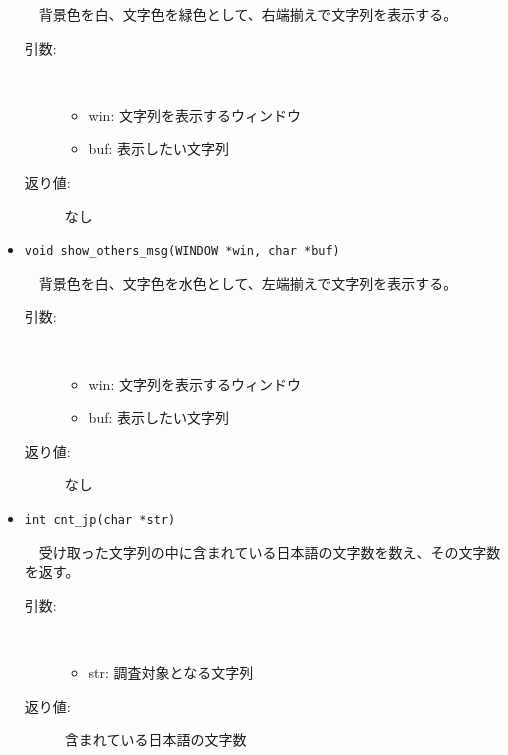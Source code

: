 \documentclass[uplatex,dvipdfmx,11pt,a4paper]{jsarticle} %
\begin{document}
\begin{itemize}
        　背景色を白、文字色を緑色として、右端揃えで文字列を表示する。
        \begin{description}
            \item[引数:] \ 

                \begin{itemize}
                    \item win: 文字列を表示するウィンドウ
                    \item buf: 表示したい文字列
                \end{itemize}
            \item[返り値:] なし
            \newline
        \end{description}

    \item {\tt void show\_others\_msg(WINDOW *win, char *buf)}

        　背景色を白、文字色を水色として、左端揃えで文字列を表示する。
        \begin{description}
            \item[引数:] \ 

                \begin{itemize}
                    \item win: 文字列を表示するウィンドウ
                    \item buf: 表示したい文字列
                \end{itemize}
            \item[返り値:] なし
            \newline
        \end{description}

    \item {\tt int cnt\_jp(char *str)}

        　受け取った文字列の中に含まれている日本語の文字数を数え、その文字数を返す。
        \begin{description}
            \item[引数:] \ 

                \begin{itemize}
                    \item str: 調査対象となる文字列
                \end{itemize}
            \item[返り値:] 含まれている日本語の文字数
        \end{description}
\end{itemize}
\end{document}
